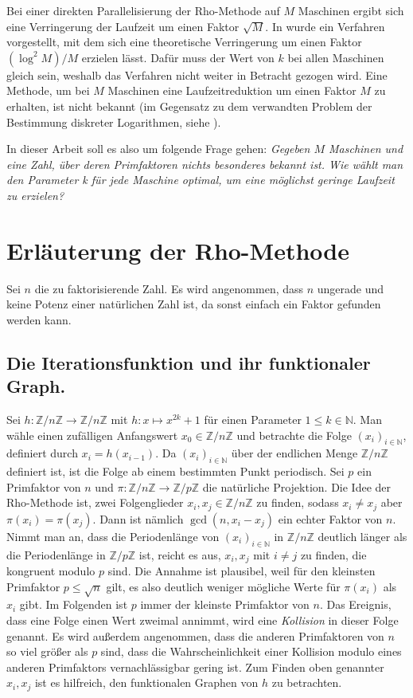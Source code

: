 \documentclass[a4paper, 11pt, ngerman]{article}
\newcommand{\N}{\mathbb{N}}
\newcommand{\Z}{\mathbb{Z}}
\theoremstyle{definition}
\theoremstyle{plain}
\theoremstyle{remark}
\begin{document}
Bei einer direkten Parallelisierung der Rho-Methode auf $M$ Maschinen ergibt sich eine Verringerung der Laufzeit um einen Faktor $\sqrt M$. In \cite{cr99} wurde ein Verfahren vorgestellt, mit dem sich eine theoretische Verringerung um einen Faktor $(\log^2 M)/M$ erzielen lässt. Dafür muss der Wert von $k$ bei allen Maschinen gleich sein, weshalb das Verfahren nicht weiter in Betracht gezogen wird. Eine Methode, um bei $M$ Maschinen eine Laufzeitreduktion um einen Faktor $M$ zu erhalten, ist nicht bekannt (im Gegensatz zu dem verwandten Problem der Bestimmung diskreter Logarithmen, siehe \cite{vow99}).

In dieser Arbeit soll es also um folgende Frage gehen: \emph{Gegeben $M$ Maschinen und eine Zahl, über deren Primfaktoren nichts besonderes bekannt ist. Wie wählt man den Parameter k für jede Maschine optimal, um eine möglichst geringe Laufzeit zu erzielen?}

\section{Erläuterung der Rho-Methode}
\label{sec:pollards-rho-method}

Sei $n$ die zu faktorisierende Zahl. Es wird angenommen, dass $n$ ungerade und keine Potenz einer natürlichen Zahl ist, da sonst einfach ein Faktor gefunden werden kann.

\subsection{Die Iterationsfunktion und ihr funktionaler Graph.}

Sei $h : \Z/n\Z \to \Z/n\Z$ mit $h : x \mapsto x^{2k} + 1$ für einen Parameter $1 \le k \in \N$. Man wähle einen zufälligen Anfangswert $x_0 \in \Z/n\Z$ und betrachte die Folge $(x_i)_{i \in \N}$, definiert durch $x_i = h(x_{i - 1})$. Da $(x_i)_{i \in \N}$ über der endlichen Menge $\Z/n\Z$ definiert ist, ist die Folge ab einem bestimmten Punkt periodisch. Sei $p$ ein Primfaktor von $n$ und $\pi : \Z/n\Z \to \Z/p\Z$ die natürliche Projektion. Die Idee der Rho-Methode ist, zwei Folgenglieder $x_i, x_j \in \Z/n\Z$ zu finden, sodass $x_i \ne x_j$ aber $\pi(x_i) = \pi(x_j)$. Dann ist nämlich $\gcd(n, x_i - x_j)$ ein echter Faktor von $n$. Nimmt man an, dass die Periodenlänge von $(x_i)_{i \in \N}$ in $\Z/n\Z$ deutlich länger als die Periodenlänge in $\Z/p\Z$ ist, reicht es aus, $x_i, x_j$ mit $i \ne j$ zu finden, die kongruent modulo $p$ sind. Die Annahme ist plausibel, weil für den kleinsten Primfaktor $p \le \sqrt n$ gilt, es also deutlich weniger mögliche Werte für $\pi(x_i)$ als $x_i$ gibt. Im Folgenden ist $p$ immer der kleinste Primfaktor von $n$. Das Ereignis, dass eine Folge einen Wert zweimal annimmt, wird eine \emph{Kollision} in dieser Folge genannt. Es wird außerdem angenommen, dass die anderen Primfaktoren von $n$ so viel größer als $p$ sind, dass die Wahrscheinlichkeit einer Kollision modulo eines anderen Primfaktors vernachlässigbar gering ist. Zum Finden oben genannter $x_i, x_j$ ist es hilfreich, den funktionalen Graphen von $h$ zu betrachten.
\end{document}
